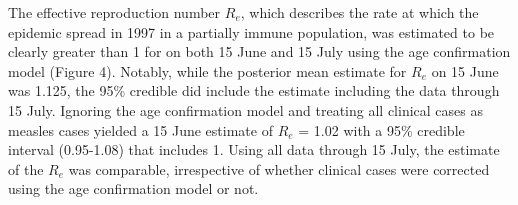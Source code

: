 The effective reproduction number $R_e$, which describes the rate at which the epidemic spread in 1997 in a partially immune population, was estimated to be clearly greater than 1 for on both 15 June and 15 July using the age confirmation model (Figure 4). Notably, while the posterior mean estimate for $R_e$ on 15 June was 1.125, the 95\% credible did include the estimate including the data through 15 July. Ignoring the age
confirmation model and treating all clinical cases as measles cases yielded a 15 June estimate of $R_e$ = 1.02 with a 95\% credible interval
(0.95-1.08) that includes 1. Using all data through 15 July, the estimate of the $R_e$ was comparable, irrespective of whether clinical cases were corrected using the age confirmation model or not.